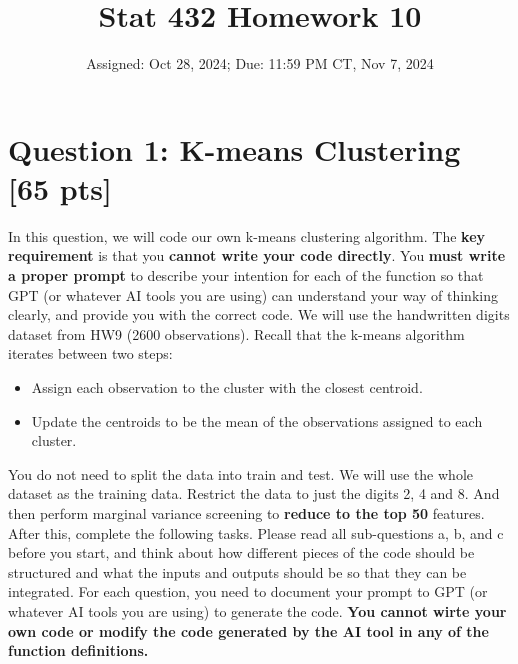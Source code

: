 \documentclass[
]{article}
\title{Stat 432 Homework 10}
\author{}
\date{\vspace{-2.5em}Assigned: Oct 28, 2024; {Due: 11:59 PM CT, Nov 7, 2024}}
\providecommand{\tightlist}{%
  \setlength{\itemsep}{0pt}\setlength{\parskip}{0pt}}
\begin{document}
\maketitle

{
\setcounter{tocdepth}{2}
\tableofcontents
}
\hypertarget{question-1-k-means-clustering-65-pts}{%
\section{Question 1: K-means Clustering {[}65
pts{]}}\label{question-1-k-means-clustering-65-pts}}

In this question, we will code our own k-means clustering algorithm. The
\textbf{key requirement} is that you \textbf{cannot write your code
directly}. You \textbf{must write a proper prompt} to describe your
intention for each of the function so that GPT (or whatever AI tools you
are using) can understand your way of thinking clearly, and provide you
with the correct code. We will use the handwritten digits dataset from
HW9 (2600 observations). Recall that the k-means algorithm iterates
between two steps:

\begin{itemize}
\tightlist
\item
  Assign each observation to the cluster with the closest centroid.
\item
  Update the centroids to be the mean of the observations assigned to
  each cluster.
\end{itemize}

You do not need to split the data into train and test. We will use the
whole dataset as the training data. Restrict the data to just the digits
2, 4 and 8. And then perform marginal variance screening to
\textbf{reduce to the top 50} features. After this, complete the
following tasks. Please read all sub-questions a, b, and c before you
start, and think about how different pieces of the code should be
structured and what the inputs and outputs should be so that they can be
integrated. For each question, you need to document your prompt to GPT
(or whatever AI tools you are using) to generate the code. \textbf{You
cannot wirte your own code or modify the code generated by the AI tool
in any of the function definitions.}
\end{document}
